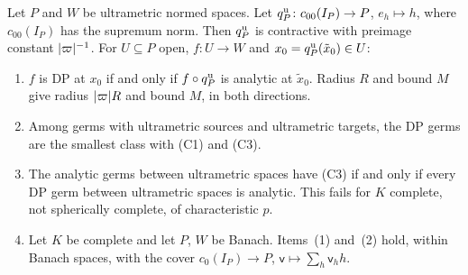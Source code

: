 \begin{theorem}\label{dp:thm:ultrametric-minimal}
Let $P$ and $W$ be ultrametric normed spaces. Let $q^{\rm u}_P\colon c_{00}(I_P)\to P$, $e_h\mapsto h$, where $c_{00}(I_P)$ has the supremum norm. Then $q^{\rm u}_P$ is contractive with preimage constant $\lvert \varpi\rvert^{-1}$. For $U\subseteq P$ open, $f\colon U\to W$ and $x_0=q^{\rm u}_P(\tilde x_0)\in U$:
\begin{enumerate}
\item $f$ is DP at $x_0$ if and only if $f\circ q^{\rm u}_P$ is analytic at $\tilde x_0$. Radius $R$ and bound $M$ give radius $\lvert \varpi\rvert R$ and bound $M$, in both directions.
\item Among germs with ultrametric sources and ultrametric targets, the DP germs are the smallest class with (C1) and (C3).
\item The analytic germs between ultrametric spaces have (C3) if and only if every DP germ between ultrametric spaces is analytic. This fails for $K$ complete, not spherically complete, of characteristic $p$.
\item Let $K$ be complete and let $P$, $W$ be Banach. Items~(1) and~(2) hold, within Banach spaces, with the cover $c_0(I_P)\to P$, $\mathsf v\mapsto\sum_h\mathsf v_hh$.
\end{enumerate}
\end{theorem}

